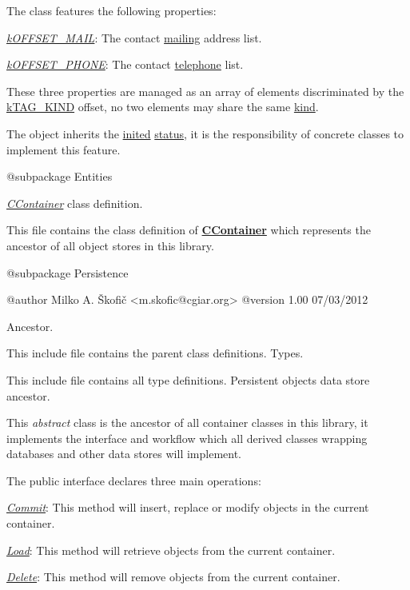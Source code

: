 The class features the following properties\-:


\begin{DoxyItemize}
\item {\itshape \hyperlink{}{k\-O\-F\-F\-S\-E\-T\-\_\-\-M\-A\-I\-L}}\-: The contact \hyperlink{}{mailing} address list. 
\item {\itshape \hyperlink{}{k\-O\-F\-F\-S\-E\-T\-\_\-\-P\-H\-O\-N\-E}}\-: The contact \hyperlink{}{telephone} list. 
\end{DoxyItemize}

These three properties are managed as an array of elements discriminated by the \hyperlink{}{k\-T\-A\-G\-\_\-\-K\-I\-N\-D} offset, no two elements may share the same \hyperlink{}{kind}.

The object inherits the \hyperlink{}{inited} \hyperlink{}{status}, it is the responsibility of concrete classes to implement this feature.

\begin{DoxyVerb}    @subpackage     Entities\end{DoxyVerb}


{\itshape \hyperlink{class_c_container}{C\-Container}} class definition.

This file contains the class definition of {\bfseries \hyperlink{class_c_container}{C\-Container}} which represents the ancestor of all object stores in this library.

\begin{DoxyVerb}    @subpackage     Persistence

    @author         Milko A. Škofič <m.skofic@cgiar.org>
    @version        1.00 07/03/2012\end{DoxyVerb}


Ancestor.

This include file contains the parent class definitions. Types.

This include file contains all type definitions. Persistent objects data store ancestor.

This {\itshape abstract} class is the ancestor of all container classes in this library, it implements the interface and workflow which all derived classes wrapping databases and other data stores will implement.

The public interface declares three main operations\-:


\begin{DoxyItemize}
\item {\itshape \hyperlink{}{Commit}}\-: This method will insert, replace or modify objects in the current container. 
\item {\itshape \hyperlink{}{Load}}\-: This method will retrieve objects from the current container. 
\item {\itshape \hyperlink{}{Delete}}\-: This method will remove objects from the current container. 
\end{DoxyItemize}


